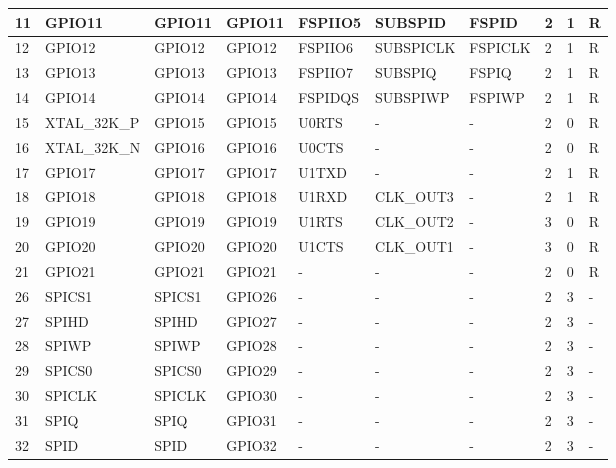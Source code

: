 \begin{longtable}[c]{|p{0.7cm}|p{1.9cm}|p{1.9cm}|p{1.7cm}|p{1.7cm}|p{1.8cm}|p{1.7cm}|p{0.5cm}<{\centering}|p{0.5cm}<{\centering}|p{0.7cm}<{\centering}| }
11 & GPIO11          &  GPIO11       & GPIO11  & FSPIIO5    & SUBSPID      & FSPID       & 2 & 1 & R \\ \hline
12 & GPIO12          &  GPIO12       & GPIO12  & FSPIIO6    & SUBSPICLK    & FSPICLK     & 2 & 1 & R \\ \hline
13 & GPIO13          &  GPIO13       & GPIO13  & FSPIIO7    & SUBSPIQ      & FSPIQ       & 2 & 1 & R \\ \hline
14 & GPIO14          &  GPIO14       & GPIO14  & FSPIDQS    & SUBSPIWP     & FSPIWP      & 2 & 1 & R \\ \hline
15 & XTAL\_32K\_P    &  GPIO15       & GPIO15  & U0RTS      & -            & -           & 2 & 0 & R \\ \hline
16 & XTAL\_32K\_N    &  GPIO16       & GPIO16  & U0CTS      & -            & -           & 2 & 0 & R \\ \hline
17 & GPIO17          &  GPIO17       & GPIO17  & U1TXD      & -            & -           & 2 & 1 & R \\ \hline
18 & GPIO18          &  GPIO18       & GPIO18  & U1RXD      & CLK\_OUT3    & -           & 2 & 1 & R \\ \hline
19 & GPIO19          &  GPIO19       & GPIO19  & U1RTS      & CLK\_OUT2    & -           & 3 & 0 & R \\ \hline
20 & GPIO20          &  GPIO20       & GPIO20  & U1CTS      & CLK\_OUT1    & -           & 3 & 0 & R \\ \hline
21 & GPIO21          &  GPIO21       & GPIO21  & -          & -            & -           & 2 & 0 & R \\ \hline
26 & SPICS1          &  SPICS1       & GPIO26  & -          & -            & -           & 2 & 3 & -    \\ \hline
27 & SPIHD           &  SPIHD        & GPIO27  & -          & -            & -           & 2 & 3 & -    \\ \hline
28 & SPIWP           &  SPIWP        & GPIO28  & -          & -            & -           & 2 & 3 & -    \\ \hline
29 & SPICS0          &  SPICS0       & GPIO29  & -          & -            & -           & 2 & 3 & -    \\ \hline
30 & SPICLK          &  SPICLK       & GPIO30  & -          & -            & -           & 2 & 3 & -    \\ \hline
31 & SPIQ            &  SPIQ         & GPIO31  & -          & -            & -           & 2 & 3 & -    \\ \hline
32 & SPID            &  SPID         & GPIO32  & -          & -             & -          & 2 & 3 & -    \\ \hline

\end{longtable}
